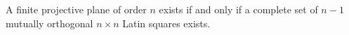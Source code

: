 A finite projective plane of order $n$ exists if and only if a complete set of $n-1$ mutually orthogonal $n \times n$ Latin squares exists.
